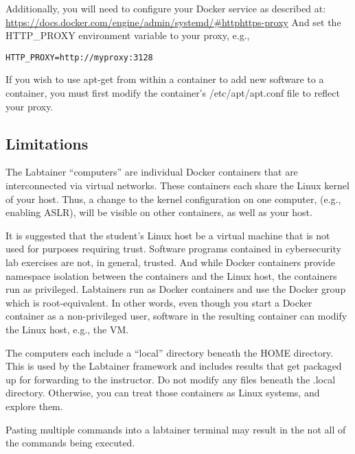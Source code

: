 \documentclass[12pt]{article}
\begin{document}
Additionally, you will need to configure your Docker service as described at:
\url{https://docs.docker.com/engine/admin/systemd/#httphttps-proxy}
And set the HTTP\_PROXY environment variable to your proxy, e.g., 
\begin{verbatim}
HTTP_PROXY=http://myproxy:3128
\end{verbatim}
If you wish to use apt-get from within a container to add new software to a container, you
must first modify the container's /etc/apt/apt.conf file to reflect your proxy.

\subsection{Limitations}
The Labtainer ``computers'' are individual Docker containers that are interconnected via virtual
networks.  These containers each share the Linux kernel of your host.  Thus, a change
to the kernel configuration on one computer, (e.g., enabling ASLR), will be visible on
other containers, as well as your host.

It is suggested that the student's Linux host be a virtual machine that is
not used for purposes requiring trust.  Software programs contained in cybersecurity lab
exercises are not, in general, trusted.  And while Docker containers provide namespace
isolation between the containers and the Linux host, the containers run as privileged.
Labtainers run as Docker containers and use the Docker group 
which is root-equivalent.  In other words, even though you start a Docker container
as a non-privileged user, software in the resulting container can modify the Linux host,
e.g., the VM.

The computers each include a ``local'' directory beneath the HOME directory.  This is used
by the Labtainer framework and includes results that get packaged up for forwarding to the
instructor.  Do not modify any files beneath the .local directory.  Otherwise, you can treat
those containers as Linux systems, and explore them.

Pasting multiple commands into a labtainer terminal may result in the not all of the
commands being executed.

\appendix 
{}
\setcounter{page}{3}
\end{document}
